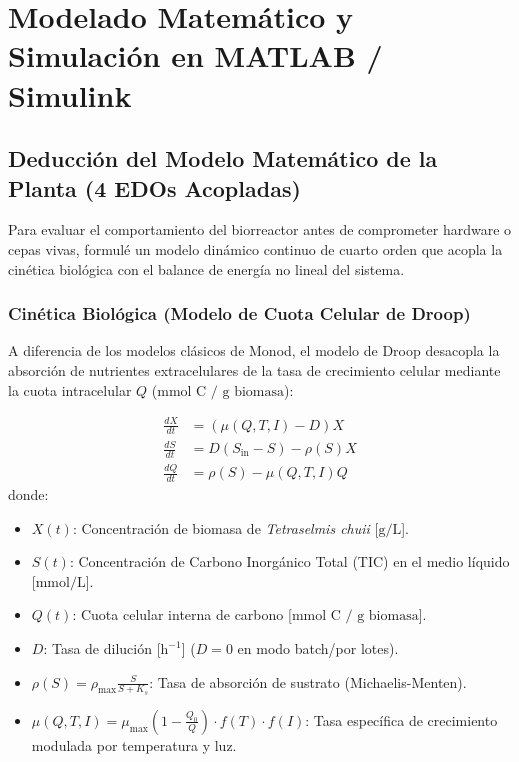 \section{Modelado Matemático y Simulación en MATLAB / Simulink}

\subsection{Deducción del Modelo Matemático de la Planta (4 EDOs Acopladas)}
Para evaluar el comportamiento del biorreactor antes de comprometer hardware o cepas vivas, formulé un modelo dinámico continuo de cuarto orden que acopla la cinética biológica con el balance de energía no lineal del sistema.

\subsubsection{Cinética Biológica (Modelo de Cuota Celular de Droop)}
A diferencia de los modelos clásicos de Monod, el modelo de Droop desacopla la absorción de nutrientes extracelulares de la tasa de crecimiento celular mediante la cuota intracelular $Q$ ($\text{mmol C / g biomasa}$):

\begin{align}
    \frac{dX}{dt} &= \left( \mu(Q, T, I) - D \right) X \label{eq:dx}\\
    \frac{dS}{dt} &= D (S_{\text{in}} - S) - \rho(S) X \label{eq:ds}\\
    \frac{dQ}{dt} &= \rho(S) - \mu(Q, T, I) Q \label{eq:dq}
\end{align}
donde:
\begin{itemize}
    \item $X(t)$: Concentración de biomasa de \textit{Tetraselmis chuii} [$\text{g/L}$].
    \item $S(t)$: Concentración de Carbono Inorgánico Total (TIC) en el medio líquido [$\text{mmol/L}$].
    \item $Q(t)$: Cuota celular interna de carbono [$\text{mmol C / g biomasa}$].
    \item $D$: Tasa de dilución [$\text{h}^{-1}$] ($D=0$ en modo batch/por lotes).
    \item $\rho(S) = \rho_{\max} \frac{S}{S + K_s}$: Tasa de absorción de sustrato (Michaelis-Menten).
    \item $\mu(Q, T, I) = \mu_{\max} \left( 1 - \frac{Q_0}{Q} \right) \cdot f(T) \cdot f(I)$: Tasa específica de crecimiento modulada por temperatura y luz.
\end{itemize}

